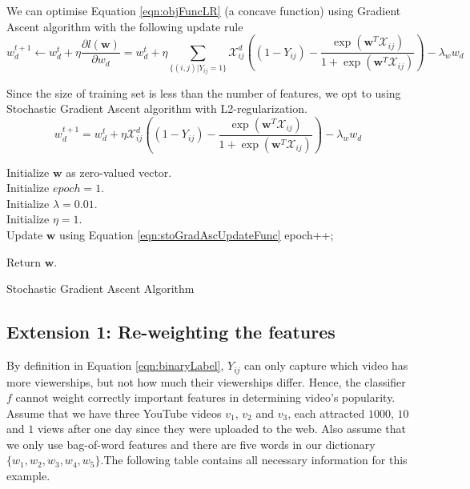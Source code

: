 We can optimise Equation \ref{eqn:objFuncLR} (a concave function) using Gradient Ascent algorithm with the following update rule
	\begin{equation}
	w^{t+1}_d \leftarrow w^t_d + \eta \frac{\partial l(\textbf{w})}{\partial w_d} = w^t_d + \eta \sum_{\{(i,j)|Y_{ij}=1\}} \mathcal{X}_{ij}^d ( (1 - Y_{ij}) - \frac{\exp(\textbf{w}^T\mathcal{X}_{ij})}{1 + \exp(\textbf{w}^T\mathcal{X}_{ij})})  - \lambda_w w_d
	\end{equation}

Since the size of training set is less than the number of features, we opt to using Stochastic Gradient Ascent algorithm with L2-regularization.
	\begin{equation}
	w^{t+1}_d = w^t_d + \eta \mathcal{X}_{ij}^d ( (1 - Y_{ij}) - \frac{\exp(\textbf{w}^T\mathcal{X}_{ij})}{1 + \exp(\textbf{w}^T\mathcal{X}_{ij})})  - \lambda_w w_d
	\label{eqn:stoGradAscUpdateFunc}
	\end{equation}

\begin{algorithm}[h]\small
Initialize $\textbf{w}$ as zero-valued vector.\\
Initialize $epoch = 1$.\\
Initialize $\lambda = 0.01$.\\
Initialize $\eta = 1$.\\

 {
	 {
		Update $\textbf{w}$ using Equation \ref{eqn:stoGradAscUpdateFunc}
	}    
	epoch++;
}

Return $\textbf{w}$.
\caption{Stochastic Gradient Ascent Algorithm} \label{algo:stoGradAsc}
\end{algorithm}

\subsection{Extension 1: Re-weighting the features}
\label{subsec:ext1}
By definition in Equation \ref{eqn:binaryLabel}, $Y_{ij}$ can only capture which video has more viewerships, but not how much their viewerships differ. Hence, the classifier $f$ cannot weight correctly important features in determining video's popularity. Assume that we have three YouTube videos $v_1$, $v_2$ and $v_3$, each attracted $1000$, $10$ and $1$ views after one day since they were uploaded to the web. Also assume that we only use bag-of-word features and there are five words in our dictionary $\{w_1, w_2, w_3, w_4, w_5\}$.The following table contains all necessary information for this example.

